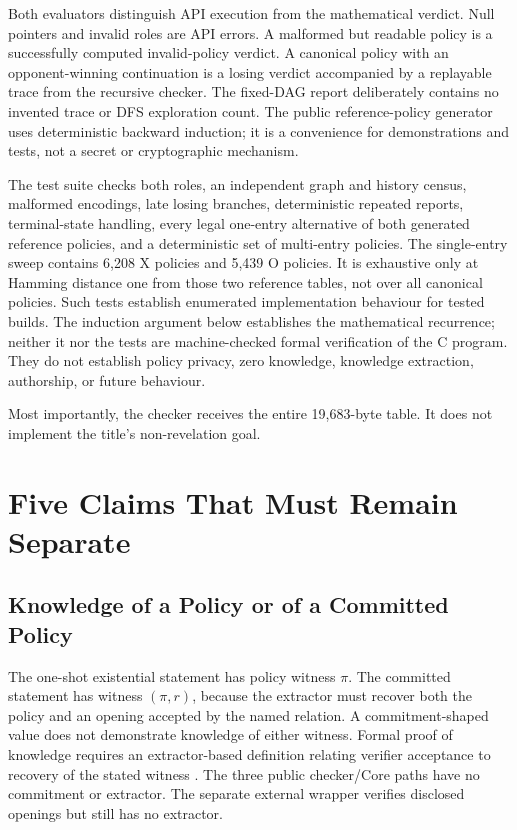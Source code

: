 Both evaluators distinguish API execution from the mathematical verdict. Null
pointers and invalid roles are API errors. A malformed but readable policy is
a successfully computed invalid-policy verdict. A canonical policy with an
opponent-winning continuation is a losing verdict accompanied by a replayable
trace from the recursive checker. The fixed-DAG report deliberately contains
no invented trace or DFS exploration count. The public reference-policy
generator uses deterministic backward
induction; it is a convenience for demonstrations and tests, not a secret or
cryptographic mechanism.

The test suite checks both roles, an independent graph and history census,
malformed encodings, late losing branches, deterministic repeated reports,
terminal-state handling, every legal one-entry alternative of both generated
reference policies, and a deterministic set of multi-entry policies. The
single-entry sweep contains 6,208 X policies and 5,439 O policies. It is
exhaustive only at Hamming distance one from those two reference tables, not
over all canonical policies. Such tests establish enumerated implementation
behaviour for tested builds. The induction argument below establishes the
mathematical recurrence; neither it nor the tests are machine-checked formal
verification of the C program. They do not establish policy privacy, zero
knowledge, knowledge extraction, authorship, or future behaviour.

Most importantly, the checker receives the entire 19,683-byte table. It does
not implement the title's non-revelation goal.

\section{Five Claims That Must Remain Separate}
\label{sec:ttt-five-claims}

\subsection{Knowledge of a Policy or of a Committed Policy}

The one-shot existential statement has policy witness $\pi$. The committed
statement has witness $(\pi,r)$, because the extractor must recover both the
policy and an opening accepted by the named relation. A commitment-shaped
value does not demonstrate knowledge of either witness. Formal proof of
knowledge requires an extractor-based definition relating verifier acceptance
to recovery of the stated witness \cite{bellare1993definingknowledge}. The
three public checker/Core paths have no commitment or extractor. The separate
external wrapper verifies disclosed openings but still has no extractor.

